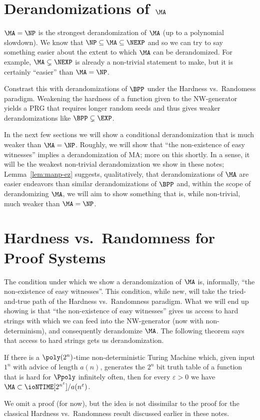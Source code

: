 \section[\texorpdfstring{Derandomizations of $\MA$}{Derandomizations of MA}]{Derandomizations of $\MA$}

$\MA = \NP$ is the strongest derandomization of $\MA$ (up to a polynomial 
slowdown).
We know that $\NP \subseteq \MA \subseteq \NEXP$ and so we can try to say 
something easier about the extent to which $\MA$ can be derandomized.
For example, $\MA \subsetneq \NEXP$ is already a non-trivial statement to make, 
but it is certainly ``easier'' than $\MA = \NP$.

Constrast this with derandomizations of $\BPP$ under the Hardness vs.\ 
Randomess paradigm.
Weakening the hardness of a function given to the NW-generator yields a PRG 
that requires longer random seeds and thus gives weaker derandomizations like 
$\BPP \subsetneq \EXP$.

In the next few sections we will show a conditional derandomization that is 
much weaker than $\MA = \NP$.
Roughly, we will show that ``the non-existence of easy witnesses'' implies a 
derandomization of MA; more on this shortly.
In a sense, it will be the weakest non-trivial derandomization we show in these 
notes; Lemma~\ref{lem:manp-ez} suggests, qualitatively, that derandomizations 
of $\MA$ are easier endeavors than similar derandomizations of $\BPP$ and, 
within the scope of derandomizing $\MA$, we will aim to show something that is, 
while non-trivial, much weaker than $\MA = \NP$.

\section{Hardness vs.\ Randomness for Proof Systems}

The condition under which we show a derandomization of $\MA$ is, informally, 
``the non-existence of easy witnesses''.
This condition, while new, will take the tried-and-true path of the Hardness 
vs.\ Randomness paradigm.
What we will end up showing is that ``the non-existence of easy witnesses'' 
gives us access to hard strings with which we can feed into the NW-generator 
(now with non-determinism), and consequently derandomize $\MA$.
The following theorem says that access to hard strings gets us derandomization.

\begin{theorem}\label{thm:hr-ma}
  If there is a $\poly(2^n)$-time non-deterministic Turing Machine which, given 
  input $1^n$ with advice of length $a(n)$, generates the $2^n$ bit truth table 
  of a function that is hard for $\Ppoly$ infinitely often, then for every 
  $\varepsilon > 0$ we have $\MA \subset \ioNTIME[2^{n^\varepsilon}]/a(n^\varepsilon)$.
\end{theorem}
\begin{proofsk}
  We omit a proof (for now), but the idea is not dissimilar to the proof for 
  the classical Hardness vs.\ Randomness result discussed earlier in these 
  notes.
\end{proofsk}

